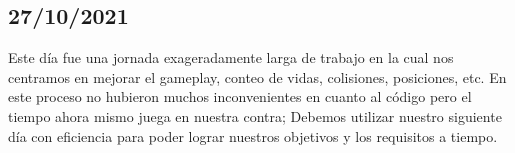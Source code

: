 \documentclass{article}
\begin{document}
    \subsection{27/10/2021}
    Este día fue una jornada exageradamente larga de trabajo en la cual nos centramos en mejorar el gameplay, conteo de vidas, colisiones, posiciones, etc. En este proceso no hubieron muchos inconvenientes en cuanto al código pero el tiempo ahora mismo juega en nuestra contra; Debemos utilizar nuestro siguiente día con eficiencia para poder lograr nuestros objetivos y los requisitos a tiempo.
    
\vfill
\vspace*{0.5cm}


\end{document}
